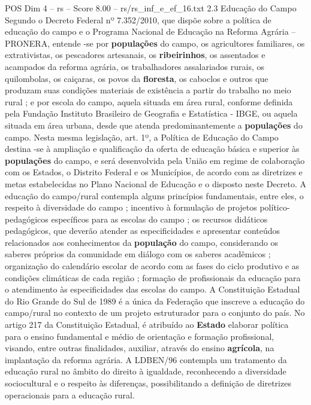 \begin{textsample}{POS Dim 4 – rs – Score 8.00 – rs/rs\_inf\_e\_ef\_16.txt}  \label{ex:f4_pos_099}
2.3 Educação do Campo Segundo o Decreto Federal nº 7.352/2010, que dispõe sobre a política de educação do campo e o Programa Nacional de Educação na Reforma Agrária – PRONERA, entende -se por \textbf{populações} do campo, os agricultores familiares, os extrativistas, os pescadores artesanais, os \textbf{ribeirinhos}, os assentados e acampados da reforma agrária, os trabalhadores assalariados rurais, os quilombolas, os caiçaras, os povos da \textbf{floresta}, os caboclos e outros que produzam suas condições materiais de existência a partir do trabalho no meio rural ; e por escola do campo, aquela situada em área rural, conforme definida pela Fundação Instituto Brasileiro de Geografia e Estatística - IBGE, ou aquela situada em área urbana, desde que atenda predominantemente a \textbf{populações} do campo.
Nesta mesma legislação, art. 1º, a Política de Educação do Campo destina -se à ampliação e qualificação da oferta de educação básica e superior às \textbf{populações} do campo, e será desenvolvida pela União em regime de colaboração com os Estados, o Distrito Federal e os Municípios, de acordo com as diretrizes e metas estabelecidas no Plano Nacional de Educação e o disposto neste Decreto.
A educação do campo/rural contempla alguns princípios fundamentais, entre eles, o respeito à diversidade do campo ; incentivo à formulação de projetos político-pedagógicos específicos para as escolas do campo ; os recursos didáticos pedagógicos, que deverão atender as especificidades e apresentar conteúdos relacionados aos conhecimentos da \textbf{população} do campo, considerando os saberes próprios da comunidade em diálogo com os saberes acadêmicos ; organização do calendário escolar de acordo com as fases do ciclo produtivo e as condições climáticas de cada região ; formação de profissionais da educação para o atendimento às especificidades das escolas do campo.
A Constituição Estadual do Rio Grande do Sul de 1989 é a única da Federação que inscreve a educação do campo/rural no contexto de um projeto estruturador para o conjunto do país.
No artigo 217 da Constituição Estadual, é atribuído ao \textbf{Estado} elaborar política para o ensino fundamental e médio de orientação e formação profissional, visando, entre outras finalidades, auxiliar, através do ensino \textbf{agrícola}, na implantação da reforma agrária.
A LDBEN/96 contempla um tratamento da educação rural no âmbito do direito à igualdade, reconhecendo a diversidade sociocultural e o respeito às diferenças, possibilitando a definição de diretrizes operacionais para a educação rural.

\end{textsample}
